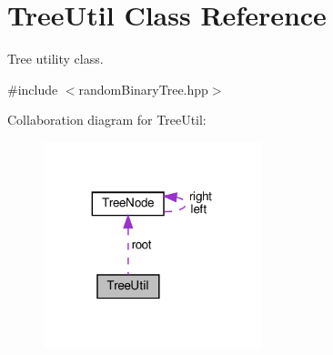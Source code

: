 \hypertarget{classTreeUtil}{}\section{Tree\+Util Class Reference}
\label{classTreeUtil}


Tree utility class.  




{\ttfamily \#include $<$random\+Binary\+Tree.\+hpp$>$}



Collaboration diagram for Tree\+Util\+:
\nopagebreak
\begin{figure}[H]
\begin{center}
\leavevmode
\includegraphics[width=179pt]{classTreeUtil__coll__graph}
\end{center}
\end{figure}
